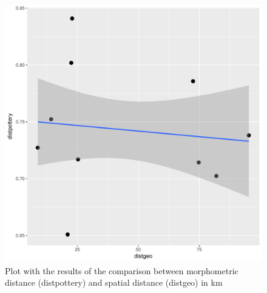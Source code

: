 \documentclass[review]{elsarticle}
\begin{document}


\begin{figure}[htp]
	\centering
\includegraphics[scale=0.60]{spatgeo.pdf}
\caption{Plot with the results of the comparison between morphometric distance (distpottery) and spatial distance (distgeo) in km}
\label{spatgeo}
\end{figure} 
\end{document}
